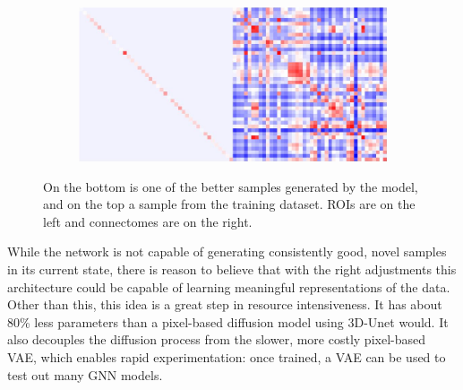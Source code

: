 \begin{figure}[!h]
\begin{subfigure}[b]{0.4\textwidth}
		\end{subfigure}
		\par\bigskip
		\begin{subfigure}[b]{0.8\textwidth}
			\centering
			\includegraphics[width=\textwidth]{figures/good-roi-sample.png}
		\end{subfigure}
		\caption{On the bottom is one of the better samples generated by the model, and on the top a sample from the training dataset. ROIs are on the left and connectomes are on the right.}
		\label{fig:roi-samples}
	\end{figure}
	
	While the network is not capable of generating consistently good, novel samples in its current state, there is reason to believe that with the right adjustments this architecture could be capable of learning meaningful representations of the data. Other than this, this idea is a great step in resource intensiveness. It has about 80\% less parameters than a pixel-based diffusion model using 3D-Unet would. It also decouples the diffusion process from the slower, more costly pixel-based VAE, which enables rapid experimentation: once trained, a VAE can be used to test out many GNN models.
	

